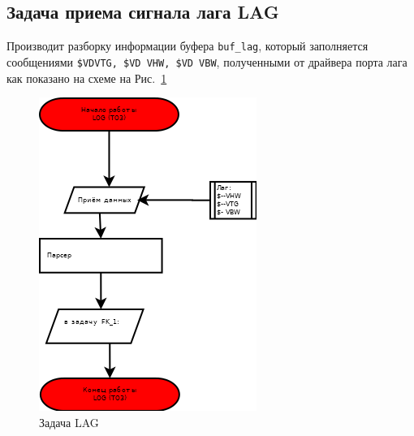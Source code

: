\subsection{Задача приема сигнала лага LAG}
Производит  разборку информации  буфера   \verb|buf_lag|,   
который заполняется сообщениями \verb|$VDVTG, $VD VHW, $VD VBW|,  полученными от  драйвера  порта лага  как показано на схеме на Рис.~\ref{fig:LAG}
\begin{figure}[H]
    \centering
    \includegraphics[width=0.75\linewidth]{images/LOG.png}
    \caption{Задача LAG}
    \label{fig:LAG}
\end{figure}


